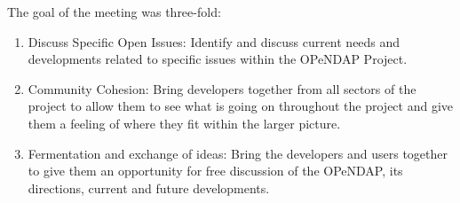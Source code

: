 The goal of the meeting was three-fold:

\begin{enumerate}
\item Discuss Specific Open Issues: Identify and discuss current needs 
      and developments related to specific issues within the \ac{OPeNDAP} Project.

\item Community Cohesion: Bring developers together from all sectors
      of the project to allow them to see what is going on throughout the
      project and give them a feeling of where they fit within the
      larger picture.

\item Fermentation and exchange of ideas:  Bring the developers and
      users together to give them an opportunity for free discussion
      of the \ac{OPeNDAP}, its directions, current and future  developments.
\end{enumerate}

%
%
%
%

